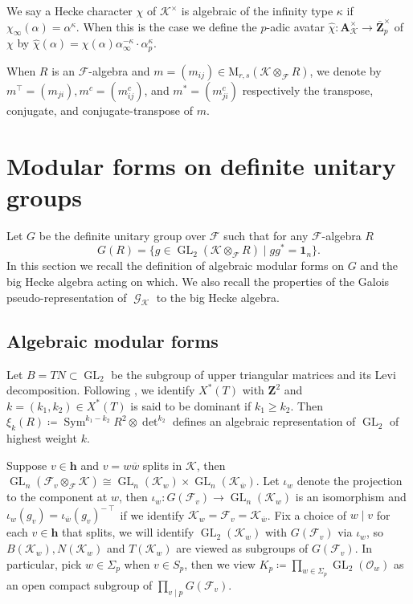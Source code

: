 \documentclass[leqno]{amsart}
\theoremstyle{definition}
\theoremstyle{remark}
\newcommand{\id}{\mathbf{1}}
\newcommand{\oo}{\mathcal{O}}
\newcommand{\Z}{{\mathbf{Z}}}
\newcommand{\A}{\mathbf A}
\newcommand{\finite}{\mathbf{h}}
\DeclareMathOperator{\Sym}{Sym}
\DeclareMathOperator{\GL}{GL}
\DeclareMathOperator{\Gal}{\mathcal{G}}
\newcommand{\F}{{\mathcal{F}}} %
\newcommand{\K}{{\mathcal{K}}} %
\newcommand{\bw}{{\overline{w}}}
\begin{document}
We say a Hecke character $\chi$ of $\K^\times$ is algebraic of
the infinity type $\kappa$ if
$\chi_\infty(\alpha)=\alpha^\kappa$.
When this is the case we define the $p$-adic avatar 
$\hat{\chi}\colon \A_\K^\times\to \bar{\Z}_p^\times$  of $\chi$ by
$\hat{\chi}(\alpha)=
\chi(\alpha)\alpha_\infty^{-\kappa}\cdot \alpha_p^{\kappa}$.
 

When $R$ is an $\F$-algebra and 
$m=(m_{ij})\in \text{M}_{r,s}(\K\otimes_\F R)$,
we denote by 
$m^\intercal=(m_{ji}), 
m^c=(m^c_{ij})$, and
$m^*=(m^c_{ji})$
respectively the transpose, conjugate, and conjugate-transpose of $m$.




\section{Modular forms on definite unitary groups}

Let $G$ be the definite unitary group over $\F$
such that for any $\F$-algebra $R$
\begin{equation*}
    G(R)=\{g\in \GL_{2}(\K\otimes_\F R) \mid gg^*=\id_n\}.
\end{equation*}
In this section we recall the definition of algebraic modular forms on $G$
and the big Hecke algebra acting on which. We also recall the properties
of the Galois pseudo-representation of $\Gal_\K$ to the big Hecke algebra.


\subsection{Algebraic modular forms}

Let $B=TN\subset \GL_2$ be the subgroup of
upper triangular matrices and its Levi decomposition.
Following \cite[Def 2.3]{ger},
we identify $X^*(T)$ with $\Z^2$
and $k=(k_1,k_2)\in X^*(T)$
is said to be dominant if $k_1\geq k_2$.
Then $\xi_k(R)\coloneqq \Sym^{k_1-k_2}R^2\otimes\det^{k_2}$
defines an algebraic representation of $\GL_2$
of highest weight $k$.


Suppose $v\in\finite$ and $v=w\bw$ splits in $\K$,
then $\GL_n(\F_v\otimes_\F\K)
\cong \GL_n(\K_w)\times\GL_n(\K_{\bw})$.
Let $\iota_w$ denote the projection to the component
at $w$, then $\iota_w\colon G(\F_v)\to \GL_n(\K_w)$
is an isomorphism and 
$\iota_w(g_v)=\iota_{\bw}(g_v)^{-\intercal}$
if we identify $\K_w=\F_v=\K_\bw$.
Fix a choice of $w\mid v$ for each $v\in\finite$ that splits,
we will identify $\GL_2(\K_w)$ with $G(\F_v)$ via $\iota_w$,
so $B(\K_w), N(\K_w)$ and $T(\K_w)$ are viewed as 
subgroups of $G(\F_v)$.
In particular, pick $w\in \Sigma_p$ when $v\in S_p$, then we view
$K_p\coloneqq\prod_{w\in \Sigma_p}\GL_2(\oo_w)$
as an open compact subgroup of $\prod_{v\mid p}G(\F_v)$.
\end{document}
